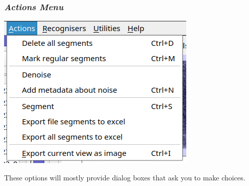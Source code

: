 \documentclass{scrartcl}
\begin{document}
\subsubsection{\textit{Actions Menu}}
\label{sec:action}

\begin{center}
\includegraphics[width=.4\textwidth]{Figures/ActionsMenu}
\end{center}

These options will mostly provide dialog boxes that ask you to make choices. 
\end{document}
